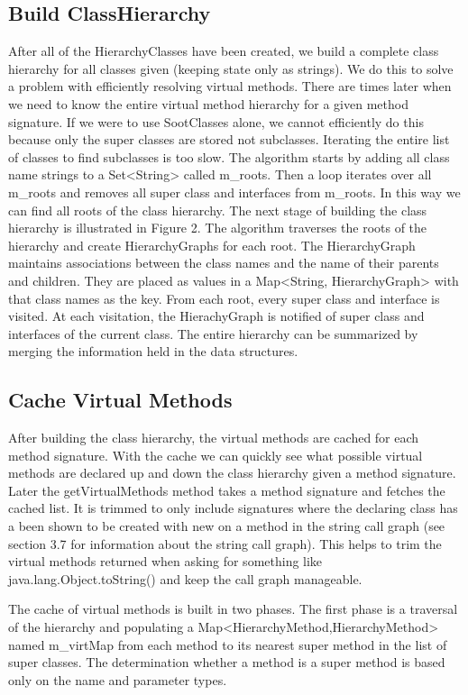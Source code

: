 \documentclass[preprint]{sigplanconf}
\begin{document}
\subsection{Build ClassHierarchy}
After all of the HierarchyClasses have been created, we build a complete class hierarchy for all classes given (keeping state only as strings). We do this to solve a problem with efficiently resolving virtual methods. There are times later when we need to know the entire virtual method hierarchy for a given method signature. If we were to use SootClasses alone, we cannot efficiently do this because only the super classes are stored not subclasses. Iterating the entire list of classes to find subclasses is too slow.
The algorithm starts by adding all class name strings to a Set<String> called m\_roots. Then a loop iterates over all m\_roots and removes all super class and interfaces from m\_roots. In this way we can find all roots of the class hierarchy.
The next stage of building the class hierarchy is illustrated in Figure 2. The algorithm traverses the roots of the hierarchy and create HierarchyGraphs for each root. The HierarchyGraph maintains associations between the class names and the name of their parents and children. They are placed as values in a Map<String, HierarchyGraph> with that class names as the key. From each root, every super class and interface is visited. At each visitation, the HierachyGraph is notified of super class and interfaces of the current class. The entire hierarchy can be summarized by merging the information held in the data structures.

\subsection{Cache Virtual Methods}
After building the class hierarchy, the virtual methods are cached for each method signature. With the cache we can quickly see what possible virtual methods are declared up and down the class hierarchy given a method signature. Later the getVirtualMethods method takes a method signature and fetches the cached list. It is trimmed to only include signatures where the declaring class has a been shown to be created with new on a method in the string call graph (see section 3.7 for information about the string call graph). This helps to trim the virtual methods returned when asking for something like java.lang.Object.toString() and keep the call graph manageable.

The cache of virtual methods is built in two phases. The first phase is a traversal of the hierarchy and populating a Map<HierarchyMethod,HierarchyMethod> named m\_virtMap from each method to its nearest super method in the list of super classes. The determination whether a method is a super method is based only on the name and parameter types.
\end{document}

